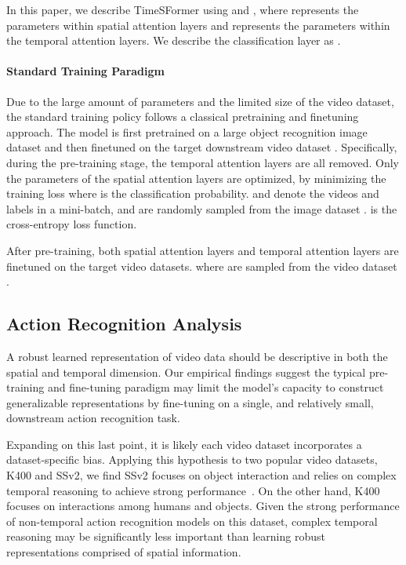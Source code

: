 In this paper, we describe TimeSFormer using  and , where  represents the parameters within spatial attention layers and  represents the parameters within the temporal attention layers. We describe the classification layer as .

\vspace{-10pt}
\paragraph{Standard Training Paradigm}
Due to the large amount of parameters and the limited size of the video dataset, the standard training policy follows a classical pretraining and finetuning approach. The model is first pretrained on a large object recognition image dataset  and then finetuned on the target downstream video dataset . Specifically, during the pre-training stage, the temporal attention layers are all removed. Only the parameters of the spatial attention layers  are optimized, by minimizing the training loss 
 where   is the classification probability.  and  denote the videos and labels in a mini-batch, and are randomly sampled from the image dataset .  is the cross-entropy loss function.

After pre-training, both spatial attention layers and temporal attention layers are finetuned on the target video datasets.
 where  are sampled from the video dataset .

\subsection{Action Recognition Analysis}

A robust learned representation of video data should be descriptive in both the spatial and temporal dimension. Our empirical findings suggest the typical pre-training and fine-tuning paradigm may limit the model's capacity to construct generalizable representations by fine-tuning on a single, and relatively small, downstream action recognition task. 


Expanding on this last point, it is likely each video dataset incorporates a dataset-specific bias. Applying this hypothesis to two popular video datasets, K400 and SSv2, we find SSv2 focuses on object interaction and relies on complex temporal reasoning to achieve strong performance~\cite{arnab2021vivit}. On the other hand, K400 focuses on interactions among humans and objects. Given the strong performance of non-temporal action recognition models on this dataset, complex temporal reasoning may be significantly less important than learning robust representations comprised of spatial information. 


